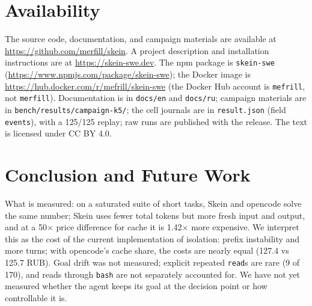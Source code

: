 \documentclass[11pt,a4paper]{article}
\begin{document}
\section{Availability}

The source code, documentation, and campaign materials are available at
\url{https://github.com/merfill/skein}. A project description and installation instructions are
at \url{https://skein-swe.dev}. The npm package is \texttt{skein-swe}
(\url{https://www.npmjs.com/package/skein-swe}); the Docker image is
\url{https://hub.docker.com/r/mefrill/skein-swe} (the Docker Hub account is \texttt{mefrill},
not \texttt{merfill}). Documentation is in \texttt{docs/en} and \texttt{docs/ru}; campaign
materials are in \texttt{bench/results/campaign-k5/}; the cell journals are in
\texttt{result.json} (field \texttt{events}), with a 125/125 replay; raw runs are published with
the release. The text is licensed under CC BY 4.0.

\section{Conclusion and Future Work}
\label{sec:future}

What is measured: on a saturated suite of short tasks, Skein and opencode solve the same number;
Skein uses fewer total tokens but more fresh input and output, and at a 50$\times$ price
difference for cache it is 1.42$\times$ more expensive. We interpret this as the cost of the
current implementation of isolation: prefix instability and more turns; with opencode's cache
share, the costs are nearly equal (127.4 vs 125.7 RUB). Goal drift was not measured; explicit
repeated \texttt{read}s are rare (9 of 170), and reads through \texttt{bash} are not separately accounted for.
We have not yet measured whether the agent keeps its goal at the decision point or how
controllable it is.
\end{document}
